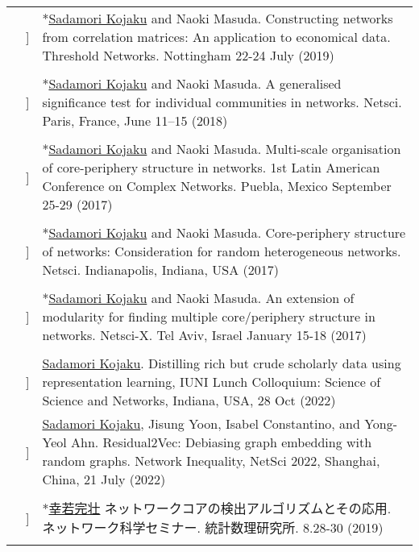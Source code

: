 \documentclass[letterpaper, 11pt]{article}
\newcounter{papercount}
\newcounter{papertype}
\newcommand{\changepapertype}{\setcounter{papercount}{0}\stepcounter{papertype}}
\newcommand{\paperitem}{%
\stepcounter{papercount}%
{\color{OliveGreen}{[\Alph{papertype}\thepapercount}]}
}
\begin{document}
\begin{longtable}{p{1.3in}p{2em}p{5.5in}}
    \nohyphens{\color{OliveGreen}{POSTER PRESENTATION (REFEREED)}}
                                                    &\paperitem & *\underline{Sadamori Kojaku} and Naoki Masuda. Constructing networks from correlation matrices: An application to economical data. Threshold Networks. Nottingham 22-24 July (2019) \\
                                                    & & \\
                                                    &\paperitem & *\underline{Sadamori Kojaku} and Naoki Masuda. A generalised significance test for individual communities in networks. Netsci. Paris, France, June 11–15 (2018)\\
                                                    & & \\
                                                    &\paperitem & *\underline{Sadamori Kojaku} and Naoki Masuda. Multi-scale organisation of core-periphery structure in networks. 1st Latin American Conference on Complex Networks. Puebla, Mexico September 25-29 (2017)\\
                                                    & & \\
                                                    &\paperitem & *\underline{Sadamori Kojaku} and Naoki Masuda. Core-periphery structure of networks: Consideration for random heterogeneous networks. Netsci. Indianapolis, Indiana, USA (2017) \\
                                                    & & \\
                                                    &\paperitem & *\underline{Sadamori Kojaku} and Naoki Masuda. An extension of modularity for finding multiple core/periphery structure in networks. Netsci-X. Tel Aviv, Israel January 15-18 (2017) \\
                                                    & & \\
    \changepapertype
    \nohyphens{\color{OliveGreen}{INVITED TALK}}
                                                    &\paperitem & \underline{Sadamori Kojaku}.
                                                    Distilling rich but crude scholarly data using representation learning, IUNI Lunch Colloquium: Science of Science and Networks, Indiana, USA, 28 Oct (2022)\\
                                                    &\paperitem & \underline{Sadamori Kojaku}, Jisung Yoon, Isabel Constantino, and Yong-Yeol Ahn.
                                                    Residual2Vec: Debiasing graph embedding with random graphs. Network Inequality, NetSci 2022, Shanghai, China, 21 July (2022)\\
                                                    & \\
                                                    &\paperitem & *\underline{幸若完壮} ネットワークコアの検出アルゴリズムとその応用. ネットワーク科学セミナー. 統計数理研究所. 8.28-30 (2019) \\
                                                    & & \\


\end{longtable}
\end{document}
